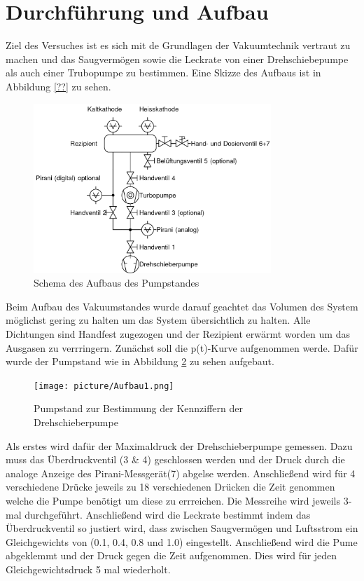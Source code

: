 \section{Durchführung und Aufbau}
\label{sec:Durchführung}
Ziel des Versuches ist es sich mit de Grundlagen der Vakuumtechnik vertraut zu machen und das Saugvermögen sowie die Leckrate von einer Drehschiebepumpe als auch einer Trubopumpe zu bestimmen. Eine Skizze des Aufbaus ist in Abbildung \ref{??} zu sehen. 
\begin{figure}[htpb]
  \centering
\includegraphics[width=0.8\textwidth]{picture/pumpaufbau.png}
  \caption{Schema des Aufbaus des Pumpstandes}
  \label{fig:pump}
\end{figure}
Beim Aufbau des Vakuumstandes wurde darauf geachtet das Volumen des System möglichst gering zu halten um das System übersichtlich zu halten. Alle Dichtungen sind Handfest zugezogen und der Rezipient erwärmt worden um das Ausgasen zu verrringern. \newline
Zunächst soll die p(t)-Kurve aufgenommen werde. Dafür wurde der Pumpstand wie in Abbildung \ref{fig:Dreh} zu sehen aufgebaut. 
\begin{figure}[htpb]
  \centering
  \texttt{[image: picture/Aufbau1.png]}
  \caption{Pumpstand zur Bestimmung der Kennziffern der Drehschieberpumpe}
  \label{fig:Dreh}
\end{figure}
Als erstes wird dafür der Maximaldruck der Drehschieberpumpe gemessen. Dazu muss das Überdruckventil (3 \& 4) geschlossen werden und der Druck durch die analoge Anzeige des Pirani-Messgerät(7) abgelse werden. Anschließend wird für 4 verschiedene Drücke jeweils zu 18 verschiedenen Drücken die Zeit genommen welche die Pumpe benötigt um diese zu errreichen. Die Messreihe wird jeweils 3-mal durchgeführt. 
Anschließend wird die Leckrate bestimmt indem das Überdruckventil so justiert wird, dass zwischen Saugvermögen und Luftsstrom ein Gleichgewichts von (0.1, 0.4, 0.8 und 1.0) eingestellt. Anschließend wird die Pume abgeklemmt und der Druck gegen die Zeit aufgenommen. Dies wird für jeden Gleichgewichtsdruck 5 mal wiederholt.  \newline

